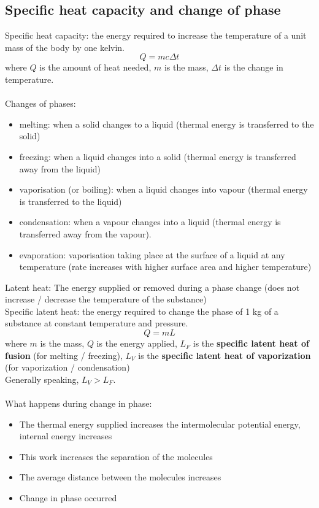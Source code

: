 \subsection{Specific heat capacity and change of phase}
Specific heat capacity: the energy required to increase the temperature of a unit mass of the body by one kelvin.
\[Q=mc\Delta t\]
where $Q$ is the amount of heat needed, $m$ is the mass, $\Delta t$ is the change in temperature.\\\\
Changes of phases:
\begin{itemize}
  \item melting: when a solid changes to a liquid (thermal energy is transferred to the solid)
  \item freezing: when a liquid changes into a solid (thermal energy is transferred away from the liquid)
  \item vaporisation (or boiling): when a liquid changes into vapour (thermal energy is transferred to the liquid)
  \item condensation: when a vapour changes into a liquid (thermal energy is transferred away from the vapour).
  \item evaporation: vaporisation taking place at the surface of a liquid at any temperature (rate increases with higher surface area and higher temperature)
\end{itemize}
Latent heat: The energy supplied or removed during a phase change (does not increase / decrease the temperature of the substance)\\
Specific latent heat: the energy required to change the phase of 1 kg of a substance at constant temperature and pressure.
\[Q=mL\]
where $m$ is the mass, $Q$ is the energy applied, $L_F$ is the \textbf{specific latent heat of fusion} (for melting / freezing), $L_V$ is the \textbf{specific latent heat of vaporization} (for vaporization / condensation)\\
Generally speaking, $L_V>L_F$.\\\\
What happens during change in phase:
\begin{itemize}
  \item The thermal energy supplied increases the intermolecular potential energy, internal energy increases
  \item This work increases the separation of the molecules
  \item The average distance between the molecules increases
  \item Change in phase occurred
\end{itemize}
